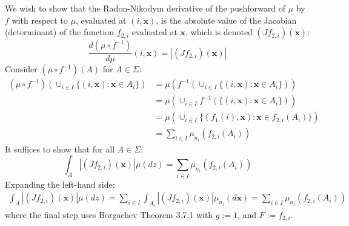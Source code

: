 \documentclass[twoside]{article}
\begin{document}
We wish to show that the Radon-Nikodym derivative of the pushforward of $\mu$ by $f$ with respect to $\mu$, evaluated at $(i, \mathbf{x})$, is the absolute value of the Jacobian (determinant) of the function $f_{2,i}$ evaluated at $\mathbf{x}$, which is denoted $(J f_{2,i})(\mathbf{x})$:
\begin{equation}
\frac{d (\mu \circ f^{-1})}{d \mu}(i, \mathbf{x})
= \left| (Jf_{2,i})(\mathbf{x})\right|
\end{equation}
Consider $(\mu \circ f^{-1})(A)$ for $A \in \Sigma$:
\begin{align}
(\mu \circ f^{-1})(\cup_{i \in I} \{ (i, \mathbf{x}) : \mathbf{x} \in A_i \})
&= \mu(f^{-1}(\cup_{i \in I} \{ (i, \mathbf{x}) : \mathbf{x} \in A_i \}))\\
&= \mu(\cup_{i \in I} f^{-1}(\{ (i, \mathbf{x}) : \mathbf{x} \in A_i \}))\\
&= \mu(\cup_{i \in I} \{ (f_1(i), \mathbf{x}) : \mathbf{x} \in f_{2,i}(A_i) \})\\
&= \sum_{i \in I} \mu_{n_i}(f_{2,i}(A_i))
\end{align}
It suffices to show that for all $A \in \Sigma$:
\begin{equation}
\int_A \left| (Jf_{2,i})(\mathbf{x})\right| \mu(dz) = \sum_{i \in I} \mu_{n_i}(f_{2,i}(A_i))
\end{equation}
Expanding the left-hand side:
\begin{align}
\int_A \left| (Jf_{2,i})(\mathbf{x})\right| \mu(dz)
= \sum_{i \in I} \int_{A_i} \left| (Jf_{2,i})(\mathbf{x})\right| \mu_{n_i}(d \mathbf{x}) %
= \sum_{i \in I} \mu_{n_i}(f_{2,i}(A_i)) %
\end{align}
where the final step uses Borgachev Theorem 3.7.1 with $g := 1$, and $F := f_{2,i}$.
\end{document}
